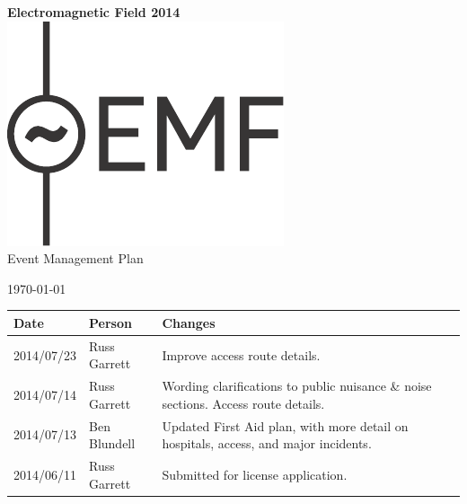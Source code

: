 

\newcommand{\st}{\superscript{st} }
\newcommand{\nd}{\superscript{nd} }
\renewcommand{\th}{\superscript{th} }



\begin{titlepage}
\begin{center}
{\bf \LARGE Electromagnetic Field 2014}\\[36pt]
\includegraphics{emf-logo.pdf}\\[48pt]
{\Large Event Management Plan}

\today

\vfill

\begin{tabular}{l | l | p{10cm}}
  Date & Person & Changes \\
  \hline
  2014/07/23 & Russ Garrett & Improve access route details. \\
  2014/07/14 & Russ Garrett & Wording clarifications to public nuisance \& noise sections. Access route details.  \\
  2014/07/13 & Ben Blundell & Updated First Aid plan, with more detail on hospitals, access, and major incidents. \\
  2014/06/11 & Russ Garrett & Submitted for license application. \\
\end{tabular}

\end{center}
\end{titlepage}

\tableofcontents

\newpage



